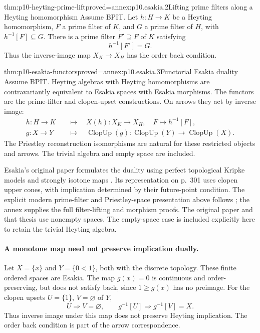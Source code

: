 \begin{hblemma}{thm:p10-heyting-prime-lift}{proved=annex:p10.esakia.2}{Lifting prime filters along a Heyting homomorphism}
Assume BPIT.
Let \(h:H\to K\) be a Heyting homomorphism, \(F\) a prime filter
of \(K\), and \(G\) a prime filter of \(H\), with
\(h^{-1}[F]\subseteq G\).
There is a prime filter \(F'\supseteq F\) of \(K\) satisfying
\[
 h^{-1}[F']=G.
\]
Thus the inverse-image map \(X_K\to X_H\) has the order back
condition.
\end{hblemma}

\begin{hbtheorem}{thm:p10-esakia-functors}{proved=annex:p10.esakia.3}{Functorial Esakia duality}
Assume BPIT.
Heyting algebras with Heyting homomorphisms are contravariantly
equivalent to Esakia spaces with Esakia morphisms.
The functors are the prime-filter and clopen-upset constructions.
On arrows they act by inverse image:
\[
\begin{aligned}
 h:H\to K&\quad\longmapsto\quad
     X(h):X_K\to X_H,\quad F\mapsto h^{-1}[F],\\
 g:X\to Y&\quad\longmapsto\quad
     \operatorname{ClopUp}(g):
     \operatorname{ClopUp}(Y)\to\operatorname{ClopUp}(X).
\end{aligned}
\]
The Priestley reconstruction isomorphisms are natural for these
restricted objects and arrows.
The trivial algebra and empty space are included.
\end{hbtheorem}

Esakia's original paper formulates the duality using perfect
topological Kripke models and strongly isotone maps
\cite[Definition~2, p.~298; Theorem~3, case \(\alpha=1\), p.~300]{Esakia1974}.
Its representation on p.~301 uses clopen upper cones, with
implication determined by their future-point condition.
The explicit modern prime-filter and Priestley-space
presentation above follows
\cite[Theorems~2.3.22 and~2.3.25, pp.~35, 37]{Bezhanishvili2006Thesis};
the annex supplies the full filter-lifting and morphism proofs.
The original paper and that thesis use nonempty spaces.
The empty-space case is included explicitly here to retain
the trivial Heyting algebra.

\paragraph{A monotone map need not preserve implication dually.}
Let \(X=\{x\}\) and \(Y=\{0<1\}\), both with the discrete topology.
These finite ordered spaces are Esakia.
The map \(g(x)=0\) is continuous and order-preserving, but does
not satisfy back, since \(1\geq g(x)\) has no preimage.
For the clopen upsets \(U=\{1\}\), \(V=\varnothing\) of \(Y\),
\[
 U\Rightarrow V=\varnothing,\qquad
 g^{-1}[U]\Rightarrow g^{-1}[V]=X.
\]
Thus inverse image under this map does not preserve Heyting
implication. The order back condition is part of the arrow
correspondence.
